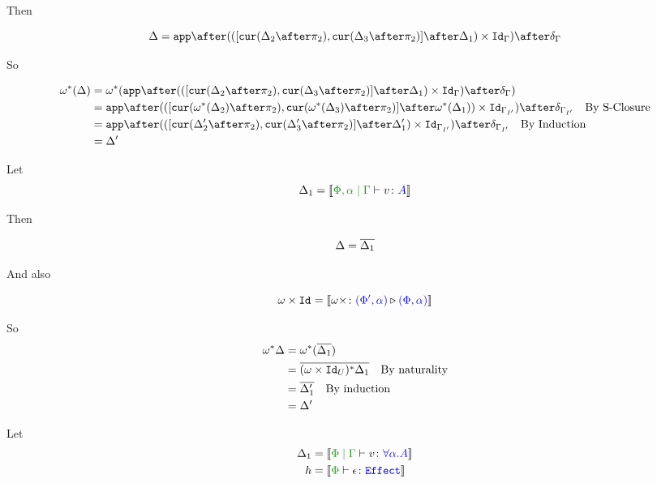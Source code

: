 \documentclass{report}
\begin{document}
Then

\begin{equation}
    \D = \app\after(([\cur{\D_2\after\pp}, \cur{\D_3\after\pp}]\after\D_1)\times\Id{\G})\after\diag{\G}\\
\end{equation}

So

\begin{align*}
    \w\star(\D) &= \w\star(\app\after(([\cur{\D_2\after\pp}, \cur{\D_3\after\pp}]\after\D_1)\times\Id{\G})\after\diag{\G})\\
    &= \app\after(([\cur{\w\star(\D_2)\after\pp}, \cur{\w\star(\D_3)\after\pp}]\after\w\star(\D_1))\times\Id{\G_{I'}})\after\diag{\G_{I'}}\qt{By S-Closure}\\
    &= \app\after(([\cur{\D_2'\after\pp}, \cur{\D_3'\after\pp}]\after\D_1')\times\Id{\G_{I'}})\after\diag{\G_{I'}}\qt{By Induction}\\
    & = \D'\\
\end{align*}



Let \begin{equation}
    \D_1 = \deno{\etyperelation{\P,\a}{\G}{v}{A}}
\end{equation}

Then

\begin{equation}
    \Delta = \overline{\Delta_1}\\
\end{equation}

And also

\begin{equation}
    \omega\times\texttt{Id}_{} = {\bf [\![}\omega\times \colon {\color{blue}(\Phi',\alpha)} \triangleright {\color {blue} (\Phi,\alpha)}{\bf ]\!]}
\end{equation}

So
\begin{align*}
    \omega^*\Delta &= \omega^*(\overline{\Delta_1})\\
    & = \overline{(\omega\times\texttt{Id}_{U})^*\Delta_1}\quad\text{By naturality}\\
    & = \overline{\Delta_1'}\quad\text{By induction}\\
    & = \Delta'
\end{align*}


Let \begin{align*}
    \D_1 &= \deno{\gpetyperelation{v}{\all{\a}{A}}}\\
    h &= \deno{\typerelation{\P}{\e}{\effect}}\\
\end{align*}
\end{document}
